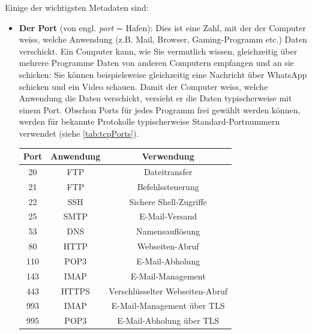 Einige der wichtigsten Metadaten sind:

\begin{itemize}
	\item \textbf{Der Port} (von engl. \textit{port} = Hafen): Dies ist eine Zahl, mit der der Computer weiss, welche Anwendung (z.B. Mail, Browser, Gaming-Programm etc.) Daten verschickt. Ein Computer kann, wie Sie vermutlich wissen, gleichzeitig über mehrere Programme Daten von anderen Computern empfangen und an sie schicken: Sie können beispielsweise gleichzeitig eine Nachricht über WhatsApp schicken und ein Video schauen. Damit der Computer weiss, welche Anwendung die Daten verschickt, versieht er die Daten typischerweise mit einem Port. Obschon Ports für jedes Programm frei gewählt werden können, werden für bekannte Protokolle typischerweise Standard-Portnummern verwendet (siehe \cref{tab:tcpPorts}).
	      \begin{table}[H]
		      \centering
		      \begin{tabular}{ccc}
			      \textbf{Port} & \textbf{Anwendung} & \textbf{Verwendung}                   \\
			      \midrule
			      20            & \acrfull{FTP}      & Dateitransfer                         \\
			      21            & \acrfull{FTP}      & Befehlssteuerung                      \\
			      22            & \acrfull{SSH}      & Sichere Shell-Zugriffe                \\
			      25            & \acrfull{SMTP}     & E-Mail-Versand                        \\
			      53            & \acrfull{DNS}      & Namensauflösung                       \\
			      80            & \acrfull{HTTP}     & Webseiten-Abruf                       \\
			      110           & \acrfull{POP3}     & E-Mail-Abholung                       \\
			      143           & \acrfull{IMAP}     & E-Mail-Management                     \\
			      443           & \acrfull{HTTPS}    & Verschlüsselter Webseiten-Abruf       \\
			      993           & \acrfull{IMAP}     & E-Mail-Management über \acrshort{TLS} \\
			      995           & \acrfull{POP3}     & E-Mail-Abholung über \acrshort{TLS}   \\
		      \end{tabular}

\end{table}
\end{itemize}
